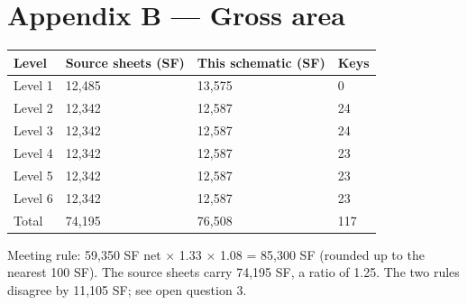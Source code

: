 \documentclass[10pt]{article}
\begin{document}
\section*{Appendix B --- Gross area}
\begin{tabular}{p{3cm}p{3.6cm}p{3.6cm}p{2cm}}\toprule \textbf{Level} & \textbf{Source sheets (SF)} & \textbf{This schematic (SF)} & \textbf{Keys} \\ \midrule
Level 1 & 12,485 & 13,575 & 0 \\
Level 2 & 12,342 & 12,587 & 24 \\
Level 3 & 12,342 & 12,587 & 24 \\
Level 4 & 12,342 & 12,587 & 23 \\
Level 5 & 12,342 & 12,587 & 23 \\
Level 6 & 12,342 & 12,587 & 23 \\
\midrule Total & 74,195 & 76,508 & 117 \\ \bottomrule
\end{tabular}

Meeting rule: 59,350 SF net $\times$ 1.33 $\times$ 1.08 = 85,300 SF (rounded up to the
nearest 100 SF). The source sheets carry 74,195 SF, a ratio of 1.25. The two rules
disagree by 11,105 SF; see open question 3.
\end{document}
